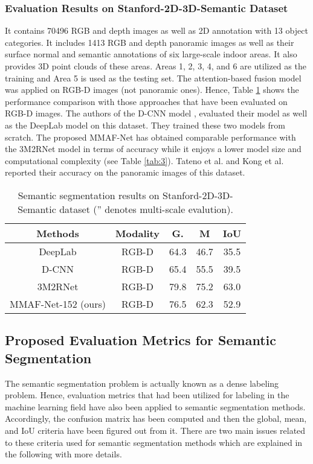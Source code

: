 \documentclass[journal,transmag]{IEEEtran}
\begin{document}
\subsubsection{Evaluation Results on Stanford-2D-3D-Semantic Dataset} 
It contains 70496 RGB and depth images as well as 2D annotation with 13 object categories. It includes 1413 RGB and depth panoramic images  as well as their surface normal and semantic annotations of six large-scale indoor areas. It also provides 3D point clouds of these areas. Areas 1, 2, 3, 4, and 6 are utilized as the training and Area 5 is used as the testing set. The attention-based fusion model was applied on RGB-D images (not panoramic ones). Hence, Table \ref{tab:5} shows the performance comparison with those approaches that have been evaluated on RGB-D images. The authors of the D-CNN model \cite{wang2018depth}, evaluated their model as well as the DeepLab \cite{chen2016deeplab} model on this dataset. They trained these two models from scratch. The proposed MMAF-Net has obtained comparable performance with the 3M2RNet model in terms of accuracy while it enjoys a lower model size and computational complexity (see Table \ref{tab:3}). Tateno et al. \cite{tateno2018distortion} and Kong et al. \cite{kong2018pixel} reported their accuracy on the panoramic images of this dataset.
\begin{table}
	\caption{Semantic segmentation results on Stanford-2D-3D-Semantic dataset ('' denotes multi-scale evalution).}
	\label{tab:5}
	\begin{tabular}{|c|c|c|c|c|}
		\hline
		Methods	&	Modality &	G.&	M&	IoU	\\
		\hline
		 DeepLab \cite{chen2016deeplab} & RGB-D&	64.3&	46.7&	35.5\\
		\hline
		 D-CNN \cite{wang2018depth} & RGB-D&65.4&	55.5&	39.5\\
		\hline
		3M2RNet \cite{fooladgar20193m2rnet} & 	RGB-D&	79.8&	75.2 &	63.0\\
		\hline
		MMAF-Net-152 (ours) & 	RGB-D&76.5	&62.3	&52.9\\
		\hline		
	\end{tabular}
\end{table}


\subsection{Proposed Evaluation Metrics for Semantic Segmentation }
The semantic segmentation problem is actually known as a dense labeling problem. Hence, evaluation metrics that had been utilized for labeling in the machine learning field have also been applied to semantic segmentation methods. Accordingly, the confusion matrix has been computed and then the global, mean, and IoU criteria have been figured out from it. There are two main issues related to these criteria used for semantic segmentation methods which are explained in the following with more details. 
\end{document}
